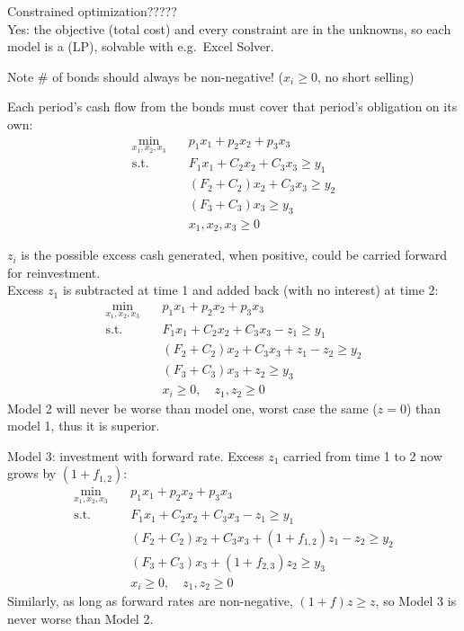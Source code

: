 Constrained optimization?????
\\Yes: the objective (total cost) and every constraint are  in the unknowns, so each model is a  (LP), solvable with e.g.\ Excel Solver.

Note \# of bonds should always be non-negative! ($x_i \geq 0$, no short selling)

Each period's cash flow from the bonds must cover that period's obligation on its own:
\[\boxed{\begin{aligned}
    \min_{x_1,x_2,x_3} \quad & p_1x_1 + p_2x_2 + p_3x_3\\
    \text{s.t.} \quad & F_1x_1 + C_2x_2 + C_3x_3 \geq y_1\\
    & (F_2 + C_2)x_2 + C_3x_3 \geq y_2\\
    & (F_3 + C_3)x_3 \geq y_3\\
    & x_1, x_2, x_3 \geq 0
\end{aligned}}\]

$z_i$ is the possible excess cash generated, when positive, could be carried forward for reinvestment.
\\Excess $z_1$ is subtracted at time 1 and added back (with no interest) at time 2:
\[\boxed{\begin{aligned}
    \min_{x_1,x_2,x_3} \quad & p_1x_1 + p_2x_2 + p_3x_3\\
    \text{s.t.} \quad & F_1x_1 + C_2x_2 + C_3x_3 - z_1 \geq y_1\\
    & (F_2 + C_2)x_2 + C_3x_3 + z_1 - z_2 \geq y_2\\
    & (F_3 + C_3)x_3 + z_2 \geq y_3\\
    & x_i \geq 0, \quad z_1, z_2 \geq 0
\end{aligned}}\]
Model 2 will never be worse than model one, worst case the same ($z=0$) than model 1, thus it is superior.

Model 3: investment with forward rate. Excess $z_1$ carried from time 1 to 2 now grows by $(1+f_{1,2})$:
\[\boxed{\begin{aligned}
    \min_{x_1,x_2,x_3} \quad & p_1x_1 + p_2x_2 + p_3x_3\\
    \text{s.t.} \quad & F_1x_1 + C_2x_2 + C_3x_3 - z_1 \geq y_1\\
    & (F_2 + C_2)x_2 + C_3x_3 + (1+f_{1,2})z_1 - z_2 \geq y_2\\
    & (F_3 + C_3)x_3 + (1+f_{2,3})z_2 \geq y_3\\
    & x_i \geq 0, \quad z_1, z_2 \geq 0
\end{aligned}}\]
Similarly, as long as forward rates are non-negative, $(1+f)z \geq z$, so Model 3 is never worse than Model 2.


